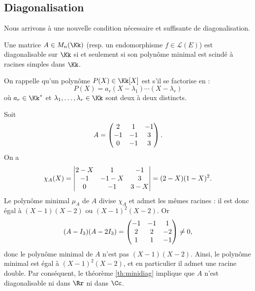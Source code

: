 \documentclass[12pt, class=report,crop=false]{standalone}
\begin{document}
\subsection{Diagonalisation}


Nous arrivons à une nouvelle condition nécessaire et suffisante de diagonalisation.


\begin{theoreme}
\label{th:minidiag}
Une matrice $A \in M_n(\Kk)$ (resp. un endomorphisme $f \in\mathcal{L}(E)$) est diagonalisable sur $\Kk$ si et seulement si son polynôme minimal est scindé à racines simples dans $\Kk$.
\end{theoreme}

On rappelle qu'un polynôme $P(X) \in \Kk[X]$ est  
s'il se factorise en :
\[P(X) = a_r (X-\lambda_1)\cdots(X-\lambda_r)\]
où $a_r \in \Kk^*$ et $\lambda_1,\ldots,\lambda_r \in \Kk$ sont deux à deux distincts. 


\begin{exemple}
Soit 
$$A=\begin{pmatrix}2&1&-1\cr -1&-1&3\cr 0&-1&3\end{pmatrix}.$$
On a 
$$\chi_A(X)=\begin{vmatrix}2-X&1&-1\cr -1&-1-X&3\cr 0&-1&3-X\end{vmatrix}=(2-X)(1-X)^2.$$
Le polynôme minimal $\mu_A$ de $A$ divise $\chi_A$ et admet les mêmes racines :
il est donc égal à $(X-1)(X-2)$ ou $(X-1)^2(X-2)$. Or
$$(A-I_3)(A-2I_3)=\begin{pmatrix}-1&-1&1\cr 2&2&-2\cr 1&1&-1\end{pmatrix}\neq 0,$$
donc le polynôme minimal de $A$ n'est pas $(X-1)(X-2)$.
Ainsi, le polynôme minimal est égal à $(X-1)^2(X-2)$, 
et en particulier il admet une racine double. Par conséquent, le théorème \ref{th:minidiag} implique que $A$ n'est diagonalisable 
ni dans $\Rr$ ni dans $\Cc$.  
\end{exemple}
\end{document}
